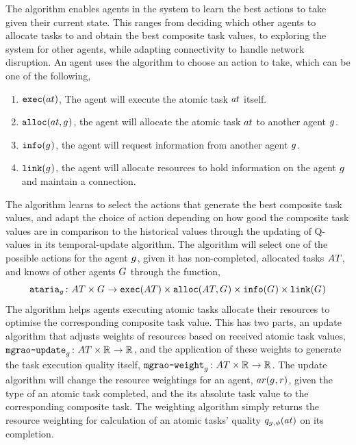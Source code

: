 The \acronymATARIA{}{} algorithm enables agents in the system to learn the best actions to take given their current state. This ranges from deciding which other agents to allocate tasks to and obtain the best composite task values, to exploring the system for other agents, while adapting connectivity to handle network disruption. An agent uses the \acronymATARIA{}{} algorithm to choose an action to take, which can be one of the following,
\begin{enumerate}
	\item $\functionExec{}{}$, The agent will execute the atomic task $\varAtomicTask{}{}$ itself.
	\item $\functionAlloc{}{}$, the agent will allocate the atomic task $\varAtomicTask{}{}$ to another agent $g_{}^{}$.
	\item $\texttt{info}(g_{}^{})$, the agent will request information from another agent $g_{}^{}$.
	\item $\texttt{link}(g_{}^{})$, the agent will allocate resources to hold information on the agent $g_{}^{}$ and maintain a connection.
\end{enumerate}
The \acronymATARIA{}{} algorithm learns to select the actions that generate the best composite task values, and adapt the choice of action depending on how good the composite task values are in comparison to the historical values through the updating of Q-values in its temporal-update algorithm. The algorithm will select one of the possible actions for the agent $g_{}^{}$, given it has non-completed, allocated tasks $\setAtomicTask{}{}$, and knows of other agents $G_{}^{}$ through the function,
\begin{equation}
\label{eq:ataria}\formalATARIA{}{}
\end{equation}
The \acronymMGRAO{}{} algorithm helps agents executing atomic tasks allocate their resources to optimise the corresponding composite task value. This has two parts, an update algorithm that adjusts weights of resources based on received atomic task values, $\label{eq:mgrao_update}\formalMGRAOUpdate{}{}$,  and the application of these weights to generate the task execution quality itself, $\label{eq:mgrao_weighting}\formalMGRAOWeighting{}{}$. The update algorithm will change the resource weightings for an agent, $\functionAgentResources{}{}$, given the type of an atomic task completed, and the its absolute task value to the corresponding composite task. The weighting algorithm simply returns the resource weighting for calculation of an atomic tasks' quality $\functionAtomicTaskQualitySignature{}{}$ on its completion.

